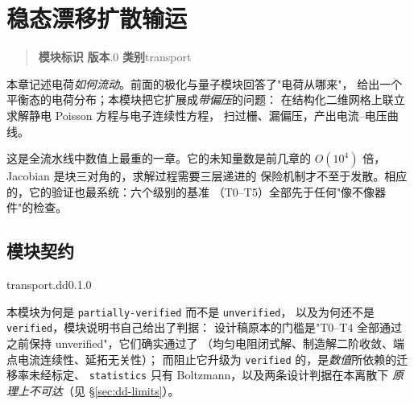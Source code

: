 
\chapter{稳态漂移扩散输运}
\label{ch:transport_dd}

\begin{quote}
\small
\noindent\textbf{模块标识}\quad{}\qquad
\textbf{版本}.0\qquad
\textbf{类别}\quad transport
\end{quote}

\noindent
本章记述电荷\emph{如何流动}。前面的极化与量子模块回答了"电荷从哪来"，
给出一个平衡态的电荷分布；本模块把它扩展成\emph{带偏压}的问题：
在结构化二维网格上联立求解静电 Poisson 方程与电子连续性方程，
扫过栅、漏偏压，产出电流--电压曲线。

这是全流水线中数值上最重的一章。它的未知量数是前几章的
$O(10^{4})$ 倍，Jacobian 是块三对角的，求解过程需要三层递进的
保险机制才不至于发散。相应的，它的验证也最系统：六个级别的基准
（T0--T5）全部先于任何"像不像器件"的检查。

\section{模块契约}
\label{sec:dd-contract}

\begin{modulecard}{transport.dd}{0.1.0}
\end{modulecard}

本模块为何是 \texttt{partially-verified} 而不是 \texttt{unverified}，
以及为何还不是 \texttt{verified}，模块说明书自己给出了判据：
设计稿原本的门槛是"T0--T4 全部通过之前保持 unverified"，它们确实通过了
（均匀电阻闭式解、制造解二阶收敛、端点电流连续性、延拓无关性）；
而阻止它升级为 \texttt{verified} 的，是\emph{数值}所依赖的迁移率未经标定、
\texttt{statistics} 只有 Boltzmann，以及两条设计判据在本离散下
\emph{原理上不可达}（见 \S\ref{sec:dd-limits}）。

